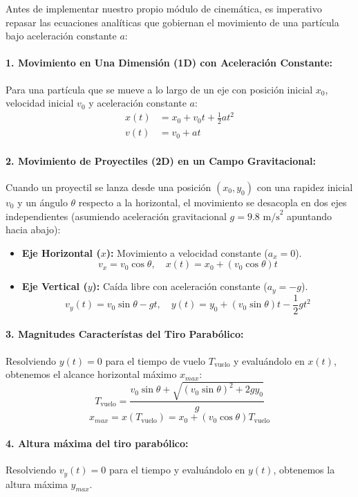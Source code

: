 \documentclass[12pt]{article}
\begin{document}
\begin{cajaflex}[Cinemática en 1D y 2D]
Antes de implementar nuestro propio módulo de cinemática, es imperativo repasar 
las ecuaciones analíticas que gobiernan el movimiento de una partícula bajo aceleración constante $a$:

\paragraph{1. Movimiento en Una Dimensión (1D) con Aceleración Constante:}
Para una partícula que se mueve a lo largo de un eje con posición inicial $x_0$, velocidad inicial $v_0$ y aceleración constante $a$:
\begin{align}
    x(t) &= x_0 + v_0 t + \frac{1}{2} a t^2 \\
    v(t) &= v_0 + a t 
\end{align}

\paragraph{2. Movimiento de Proyectiles (2D) en un Campo Gravitacional:}
Cuando un proyectil se lanza desde una posición $(x_0, y_0)$ con una rapidez inicial $v_0$ y un ángulo $\theta$ respecto a la horizontal, el movimiento se desacopla en dos ejes independientes (asumiendo aceleración gravitacional $g = 9.8\text{ m/s}^2$ apuntando hacia abajo):

\begin{itemize}
    \item \textbf{Eje Horizontal ($x$):} Movimiento a velocidad constante ($a_x = 0$).
    \begin{equation}
        v_x = v_0 \cos\theta, \quad x(t) = x_0 + (v_0 \cos\theta) t
    \end{equation}
    
    \item \textbf{Eje Vertical ($y$):} Caída libre con aceleración constante ($a_y = -g$).
    \begin{equation}
        v_y(t) = v_0 \sin\theta - g t, \quad y(t) = y_0 + (v_0 \sin\theta) t - \frac{1}{2} g t^2
    \end{equation}
\end{itemize}

\paragraph{3. Magnitudes Característas del Tiro Parabólico:}
Resolviendo $y(t) = 0$ para el tiempo de vuelo $T_{\text{vuelo}}$ y evaluándolo en $x(t)$, 
obtenemos el alcance horizontal máximo $x_{max}$:
\begin{equation}
    T_{\text{vuelo}} = \frac{v_0 \sin\theta + \sqrt{(v_0 \sin\theta)^2 + 2 g y_0}}{g}
\end{equation}
\begin{equation}
    x_{max} = x(T_{\text{vuelo}}) = x_0 + (v_0 \cos\theta) T_{\text{vuelo}}
\end{equation}
\paragraph{4. Altura máxima del tiro parabólico:}
Resolviendo $v_y(t) = 0$ para el tiempo y evaluándolo en $y(t)$, 
obtenemos la altura máxima $y_{max}$.
\end{cajaflex}
\end{document}
